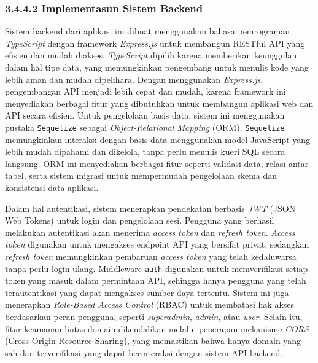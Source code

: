 \subsubsection{3.4.4.2 Implementasun Sistem Backend}

Sistem backend dari aplikasi ini dibuat menggunakan bahasa pemrograman \textit{TypeScript} dengan framework \textit{Express.js} untuk membangun RESTful API yang efisien dan mudah diakses. \textit{TypeScript} dipilih karena memberikan keunggulan dalam hal tipe data, yang memungkinkan pengembang untuk menulis kode yang lebih aman dan mudah dipelihara. Dengan menggunakan \textit{Express.js}, pengembangan API menjadi lebih cepat dan mudah, karena framework ini menyediakan berbagai fitur yang dibutuhkan untuk membangun aplikasi web dan API secara efisien. Untuk pengelolaan basis data, sistem ini menggunakan pustaka \texttt{Sequelize} sebagai \textit{Object-Relational Mapping} (ORM). \texttt{Sequelize} memungkinkan interaksi dengan basis data menggunakan model JavaScript yang lebih mudah dipahami dan dikelola, tanpa perlu menulis kueri SQL secara langsung. ORM ini menyediakan berbagai fitur seperti validasi data, relasi antar tabel, serta sistem migrasi untuk mempermudah pengelolaan skema dan konsistensi data aplikasi.

Dalam hal autentikasi, sistem menerapkan pendekatan berbasis \textit{JWT} (JSON Web Tokens) untuk login dan pengelolaan sesi. Pengguna yang berhasil melakukan autentikasi akan menerima \textit{access token} dan \textit{refresh token}. \textit{Access token} digunakan untuk mengakses endpoint API yang bersifat privat, sedangkan \textit{refresh token} memungkinkan pembaruan \textit{access token} yang telah kedaluwarsa tanpa perlu login ulang. Middleware \texttt{auth} digunakan untuk memverifikasi setiap token yang masuk dalam permintaan API, sehingga hanya pengguna yang telah terautentikasi yang dapat mengakses sumber daya tertentu. Sistem ini juga menerapkan \textit{Role-Based Access Control} (RBAC) untuk membatasi hak akses berdasarkan peran pengguna, seperti \textit{superadmin}, \textit{admin}, atau \textit{user}. Selain itu, fitur keamanan lintas domain dikendalikan melalui penerapan mekanisme \textit{CORS} (Cross-Origin Resource Sharing), yang memastikan bahwa hanya domain yang sah dan terverifikasi yang dapat berinteraksi dengan sistem API backend.

